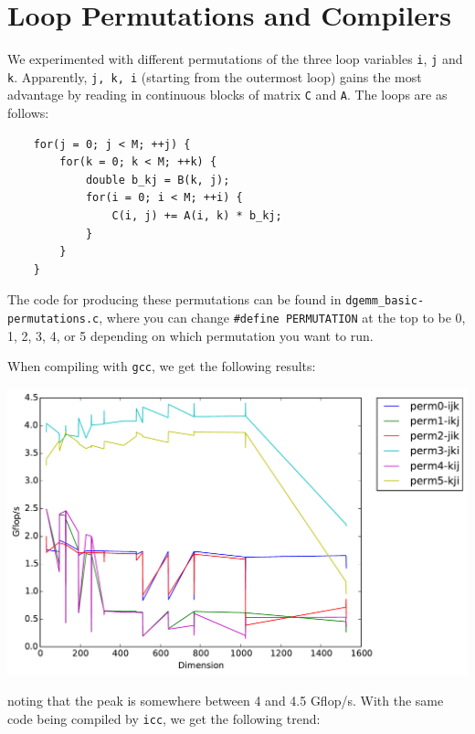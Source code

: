 \documentclass[11pt]{article}
\begin{document}
\newpage
\section{Loop Permutations and Compilers}

We experimented with different permutations of the three loop variables \texttt{i}, \texttt{j} and \texttt{k}. Apparently, \texttt{j, k, i} (starting from the outermost loop) gains the most advantage by reading in continuous blocks of matrix \texttt{C} and \texttt{A}. The loops are as follows:

\begin{lstlisting}
    for(j = 0; j < M; ++j) {
        for(k = 0; k < M; ++k) {
            double b_kj = B(k, j);
            for(i = 0; i < M; ++i) {
                C(i, j) += A(i, k) * b_kj;
            }
        }
    }
\end{lstlisting}

\noindent The code for producing these permutations can be found in \texttt{dgemm\_basic-permutations.c}, where you can change \texttt{\#define PERMUTATION} at the top to be 0, 1, 2, 3, 4, or 5 depending on which permutation you want to run.

\noindent When compiling with \texttt{gcc}, we get the following results:

\begin{center}
    \includegraphics[scale=0.5]{benchmarking/permutations/gcc/timing.pdf}
\end{center}

\noindent noting that the peak is somewhere between 4 and 4.5 Gflop/s.  With the same code being compiled by \texttt{icc}, we get the following trend:
\end{document}
